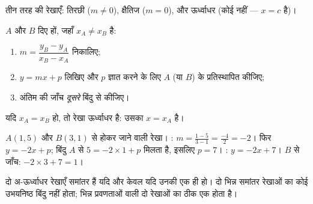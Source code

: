 \begin{omfigure}

{\small तीन तरह की रेखाएँ: तिरछी ($m \neq 0$), क्षैतिज ($m = 0$), और ऊर्ध्वाधर (कोई
 नहीं ---  $x = c$ है)।}
\end{omfigure}

\begin{method}\label{met:g10:lines:through}
$A$ और $B$ दिए हों, जहाँ $x_A \neq x_B$ है:
\begin{enumerate}
  \item {} $m = \dfrac{y_B - y_A}{x_B - x_A}$ निकालिए;
  \item $y = mx + p$ लिखिए और $p$ ज्ञात करने के लिए $A$ (या $B$) के 
        प्रतिस्थापित कीजिए;
  \item अंतिम  की जाँच \emph{दूसरे} बिंदु से कीजिए।
\end{enumerate}
यदि $x_A = x_B$ हो, तो रेखा ऊर्ध्वाधर है: उसका  $x = x_A$ है।
\end{method}

\begin{example}\label{ex:g10:lines:through}
$A(1, 5)$ और $B(3, 1)$ से होकर जाने वाली रेखा। : $m = \frac{1 - 5}{3 - 1} = \frac{-4}{2} = -2$। फिर $y = -2x + p$; बिंदु $A$ से
$5 = -2 \times 1 + p$ मिलता है, इसलिए $p = 7$। : $y = -2x + 7$। $B$ से जाँच: $-2 \times 3 + 7 = 1$।
\end{example}

\begin{proposition}[समांतर रेखाएँ]\label{prop:g10:lines:parallel}
दो अ-ऊर्ध्वाधर रेखाएँ समांतर हैं यदि और केवल यदि उनकी  एक ही हो। दो
भिन्न समांतर रेखाओं का कोई उभयनिष्ठ बिंदु नहीं होता; भिन्न प्रवणताओं वाली दो
रेखाओं का ठीक एक होता है।
\end{proposition}

